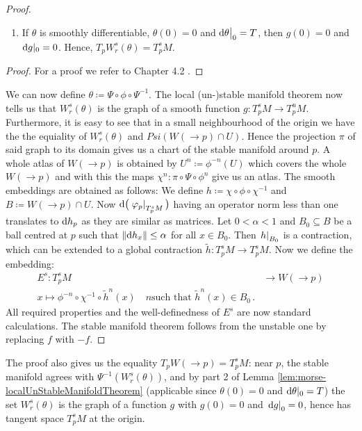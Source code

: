 \begin{proof}
\begin{lemma}
\begin{enumerate}
		\item If $\theta$ is smoothly differentiable, $\theta(0)=0$ and $\mathop{}\!\mathrm{d} \theta\big|_0=T$, then $g(0)=0$ and $\mathop{}\!\mathrm{d} g |_0=0$. Hence, $T _pW^s_r(\theta)=T^s_pM$.
	\end{enumerate}
	\end{lemma}
	\begin{proof}
		For a proof we refer to Chapter 4.2 \cite{banyaga2004lectures}.
	\end{proof}
	We can now define $\theta \coloneq \Psi \circ \phi \circ \Psi^{-1}$. The local (un-)stable manifold theorem now tells us that $W^s_r(\theta)$ is the graph of a smooth function $g: T^s_pM\to T^u_pM$. Furthermore, it is easy to see that in a small neighbourhood of the origin we have the the equiality of $W^s_r(\theta)$ and $Psi(W(\to p)\cap U)$. Hence the projection $\pi$ of said graph to its domain gives us a chart of the stable manifold around $p$. A whole atlas of $W(\to p)$ is obtained by $U^n\coloneq \phi^{-n}(U)$ which covers the whole $W(\to p)$ and with this  the maps $\chi^n:\pi\circ \Psi \circ \phi^n$ give us an atlas.
	The smooth embeddings are obtained as follows: We define $h\coloneq \chi \circ \phi \circ \chi^{-1}$ and $B\coloneq W(\to p)\cap U$. Now $\mathop{}\!\mathrm{d} \big(\left.\varphi_p\right|_{T^s_pM}\big)$ having an operator norm less than one translates to $\mathop{}\!\mathrm{d} h_p$ as they are similar as matrices. Let $0<\alpha<1$ and $B_0\subseteq B$ be a ball centred at $p$ such that $\left\lVert\mathop{}\!\mathrm{d} h_x\right\rVert\leq \alpha$ for all $x\in B_0$. Then $\left.h\right|_{B_0}$ is a contraction, which can be extended to a global contraction $\tilde{h}:T^s_pM\to T^s_pM$. Now we define the embedding:
	\begin{align*}
		E^s:T^s_pM&\to W(\to p) \\
		x\mapsto \phi^{-n}\circ \chi^{-1}\circ \tilde{h}^n(x)\quad n \text{such that }\tilde{h}^n(x)\in B_0 \,.
	\end{align*} All required properties and the well-definedness of $E^s$ are now standard calculations. The stable manifold theorem follows from the unstable one by replacing $f$ with $-f$. 
\end{proof}


\begin{remark}\label{rem:morse-tangendspaceOfStableManifold}
    The proof also gives us the equality $T_pW(\to p)=T^s_pM$: near
    $p$, the stable manifold agrees with $\Psi^{-1}(W^s_r(\theta))$,
    and by part 2 of Lemma
    \ref{lem:morse-localUnStableManifoldTheorem} (applicable since
    $\theta(0)=0$ and $\mathop{}\!\mathrm{d}\theta|_0=T$) the set $W^s_r(\theta)$ is
    the graph of a function $g$ with $g(0)=0$ and $\left.\mathop{}\!\mathrm{d} g\right|_{0}=0$,
    hence has tangent space $T^s_pM$ at the origin.
\end{remark}

